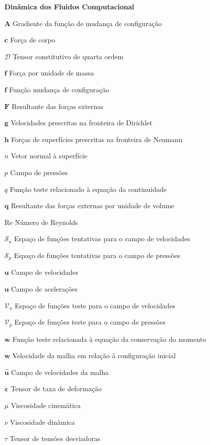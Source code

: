 \documentclass[12pt,
	openright,	%
	twoside,    %
	a4paper,			%
	sumario=tradicional,
	english,			%
	french, 			%
	brazil				%
]{USPSC}
\newcommand{\script}[1]{\mathcal{#1}}
\newcommand{\Rey}{\mathrm{Re}}
\newcommand{\BB}[1]{\mathbf{#1}}
\begin{document}
\begin{simbolos}
    \item[\textbf{Dinâmica dos Fluidos Computacional}]
    \item[$\BB{A}$] Gradiente da função de mudança de configuração
    \item[$\BB{c}$] Força de corpo
    \item[$\script{D}$] Tensor constitutivo de quarta ordem
    \item[$\BB{f}$] Força por unidade de massa
    \item[$\BB{f}$] Função mudança de configuração
    \item[$\BB{F}$] Resultante das forças externas
    \item[$\BB{g}$] Velocidades prescritas na fronteira de Dirichlet
    \item[$\BB{h}$] Forças de superfícies prescritas na fronteira de Neumann
    \item[$n$] Vetor normal à superfície
    \item[$p$] Campo de pressões
    \item[$q$] Função teste relacionado à equação da continuidade
    \item[$\BB{q}$] Resultante das forças externas por unidade de volume
    \item[$\Rey$] Número de Reynolds
    \item[$\script{S}_u$] Espaço de funções tentativas para o campo de velocidades
    \item[$\script{S}_p$] Espaço de funções tentativas para o campo de pressões
    \item[$\BB{u}$] Campo de velocidades
    \item[$\dot{\BB{u}}$] Campo de acelerações
    \item[$\script{V}_u$] Espaço de funções teste para o campo de velocidades
    \item[$\script{V}_p$] Espaço de funções teste para o campo de pressões
    \item[$\BB{w}$] Função teste relacionada à equação da conservação do momento
    \item[$\BB{w}$] Velocidade da malha em relação à configuração inicial
    \item[$\BB{\hat{u}}$] Campo de velocidades da malha
    \item[$\BB{\dot{\varepsilon}}$] Tensor de taxa de deformação
    \item[$\mu$] Viscosidade cinemática
    \item[$\nu$] Viscosidade dinâmica
    \item[$\tau$] Tensor de tensões desviadoras


\end{simbolos}
\end{document}
